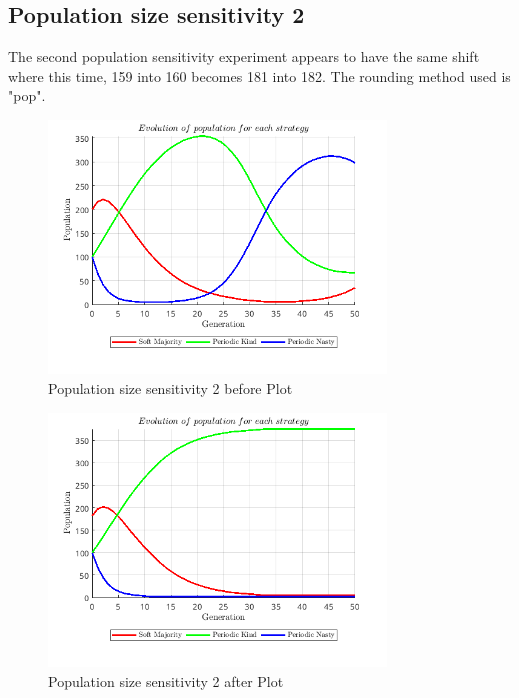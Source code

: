 \subsection{Population size sensitivity 2}
The second population sensitivity experiment appears to have the same shift where this time, 159 into 160 becomes 181 into 182. The rounding method used is "pop".
\begin{figure}[H]
    \centering
    \includegraphics[width=0.8\textwidth]{media/meetings/population_size_sensitivity_2_before_pop.png}
    \caption{Population size sensitivity 2 before Plot}
\end{figure}
\begin{figure}[H]
    \centering
    \includegraphics[width=0.8\textwidth]{media/meetings/population_size_sensitivity_2_after_pop.png}
    \caption{Population size sensitivity 2 after Plot}
\end{figure}

